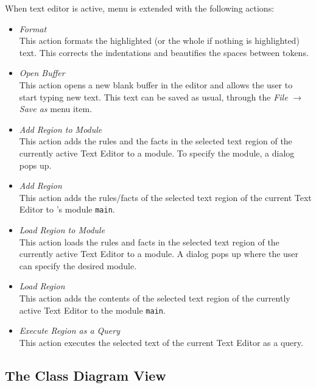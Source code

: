 When \FVIZ text editor is active,
\FLORA menu is extended with the following actions:

\begin{itemize}
\item \emph{Format}\\
  This action formats the highlighted (or the whole if nothing is
  highlighted) text.  This corrects the indentations and beautifies the
  spaces between tokens.

\item \emph{Open Buffer}\\
  This action opens a new blank buffer in the editor and allows the user to
  start typing new text. This text can be saved as usual, through the
  \emph{File} $\rightarrow$ \emph{Save as} menu item.

\item \emph{Add Region to Module}\\
  This action adds the rules and the facts in the
  selected text region of the currently active
  \FVIZ Text Editor to a \FLORA module.
  To specify the module, a dialog pops up.

\item \emph{Add Region}  \\
  This action adds the rules/facts of
  the selected text region of the current \FVIZ Text
  Editor to \FLORA's module {\tt main}.

\item \emph{Load Region to Module} \\
  This action loads the rules and facts in the
  selected text region of the currently active
  \FVIZ Text Editor to a
  \FLORA module.  A dialog pops up where the user can specify the desired
  module.

\item \emph{Load Region}  \\
  This action adds the contents of
  the selected text region of the currently active Text Editor to
  the \FLORA module {\tt main}.

\item \emph{Execute Region as a Query}  \\
  This action executes the selected text of the current \FVIZ Text Editor
  as a query.

\end{itemize}

\subsection{The \FVIZ Class Diagram View}
\label{sec:visualizerview}

